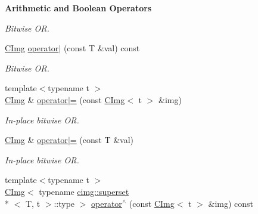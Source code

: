 \begin{Indent}{\bf Arithmetic and Boolean Operators}
\begin{DoxyCompactItemize}
\begin{DoxyCompactList}\small\item\em Bitwise O\-R. \end{DoxyCompactList}\item 
\hypertarget{structcimg__library_1_1_c_img_a6c694fe3eaca0e0ebd6ea53525a4b2f1}{\hyperlink{structcimg__library_1_1_c_img}{C\-Img} \hyperlink{structcimg__library_1_1_c_img_a6c694fe3eaca0e0ebd6ea53525a4b2f1}{operator$\vert$} (const T \&val) const }\label{structcimg__library_1_1_c_img_a6c694fe3eaca0e0ebd6ea53525a4b2f1}

\begin{DoxyCompactList}\small\item\em Bitwise O\-R. \end{DoxyCompactList}\item 
\hypertarget{structcimg__library_1_1_c_img_a98ebba09ea6ac02a49e2a395315f80cf}{{\footnotesize template$<$typename t $>$ }\\\hyperlink{structcimg__library_1_1_c_img}{C\-Img} \& \hyperlink{structcimg__library_1_1_c_img_a98ebba09ea6ac02a49e2a395315f80cf}{operator$\vert$=} (const \hyperlink{structcimg__library_1_1_c_img}{C\-Img}$<$ t $>$ \&img)}\label{structcimg__library_1_1_c_img_a98ebba09ea6ac02a49e2a395315f80cf}

\begin{DoxyCompactList}\small\item\em In-\/place bitwise O\-R. \end{DoxyCompactList}\item 
\hypertarget{structcimg__library_1_1_c_img_a882cfef8c5a370648a72037392e79335}{\hyperlink{structcimg__library_1_1_c_img}{C\-Img} \& \hyperlink{structcimg__library_1_1_c_img_a882cfef8c5a370648a72037392e79335}{operator$\vert$=} (const T \&val)}\label{structcimg__library_1_1_c_img_a882cfef8c5a370648a72037392e79335}

\begin{DoxyCompactList}\small\item\em In-\/place bitwise O\-R. \end{DoxyCompactList}\item 
\hypertarget{structcimg__library_1_1_c_img_a6a229fe7a0a52dd3036f94fe19083cc0}{{\footnotesize template$<$typename t $>$ }\\\hyperlink{structcimg__library_1_1_c_img}{C\-Img}$<$ typename \hyperlink{structcimg__library_1_1cimg_1_1superset}{cimg\-::superset}\\*
$<$ T, t $>$\-::type $>$ \hyperlink{structcimg__library_1_1_c_img_a6a229fe7a0a52dd3036f94fe19083cc0}{operator$^\wedge$} (const \hyperlink{structcimg__library_1_1_c_img}{C\-Img}$<$ t $>$ \&img) const }\label{structcimg__library_1_1_c_img_a6a229fe7a0a52dd3036f94fe19083cc0}


\end{DoxyCompactItemize}
\end{Indent}
